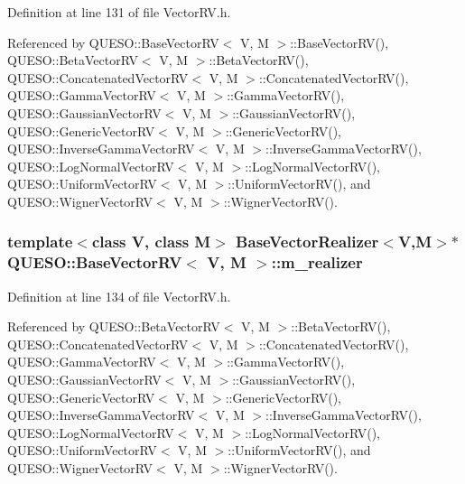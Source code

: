 Definition at line 131 of file Vector\-R\-V.\-h.



Referenced by Q\-U\-E\-S\-O\-::\-Base\-Vector\-R\-V$<$ V, M $>$\-::\-Base\-Vector\-R\-V(), Q\-U\-E\-S\-O\-::\-Beta\-Vector\-R\-V$<$ V, M $>$\-::\-Beta\-Vector\-R\-V(), Q\-U\-E\-S\-O\-::\-Concatenated\-Vector\-R\-V$<$ V, M $>$\-::\-Concatenated\-Vector\-R\-V(), Q\-U\-E\-S\-O\-::\-Gamma\-Vector\-R\-V$<$ V, M $>$\-::\-Gamma\-Vector\-R\-V(), Q\-U\-E\-S\-O\-::\-Gaussian\-Vector\-R\-V$<$ V, M $>$\-::\-Gaussian\-Vector\-R\-V(), Q\-U\-E\-S\-O\-::\-Generic\-Vector\-R\-V$<$ V, M $>$\-::\-Generic\-Vector\-R\-V(), Q\-U\-E\-S\-O\-::\-Inverse\-Gamma\-Vector\-R\-V$<$ V, M $>$\-::\-Inverse\-Gamma\-Vector\-R\-V(), Q\-U\-E\-S\-O\-::\-Log\-Normal\-Vector\-R\-V$<$ V, M $>$\-::\-Log\-Normal\-Vector\-R\-V(), Q\-U\-E\-S\-O\-::\-Uniform\-Vector\-R\-V$<$ V, M $>$\-::\-Uniform\-Vector\-R\-V(), and Q\-U\-E\-S\-O\-::\-Wigner\-Vector\-R\-V$<$ V, M $>$\-::\-Wigner\-Vector\-R\-V().

\hypertarget{class_q_u_e_s_o_1_1_base_vector_r_v_ad99bc05293c0fd0a0accb3191fb7119e}{
\subsubsection[{m\-\_\-realizer}]{\setlength{\rightskip}{0pt plus 5cm}template$<$class V, class M$>$ {\bf Base\-Vector\-Realizer}$<$V,M$>$$\ast$ {\bf Q\-U\-E\-S\-O\-::\-Base\-Vector\-R\-V}$<$ V, M $>$\-::m\-\_\-realizer\hspace{0.3cm}{\ttfamily [protected]}}}\label{class_q_u_e_s_o_1_1_base_vector_r_v_ad99bc05293c0fd0a0accb3191fb7119e}


Definition at line 134 of file Vector\-R\-V.\-h.



Referenced by Q\-U\-E\-S\-O\-::\-Beta\-Vector\-R\-V$<$ V, M $>$\-::\-Beta\-Vector\-R\-V(), Q\-U\-E\-S\-O\-::\-Concatenated\-Vector\-R\-V$<$ V, M $>$\-::\-Concatenated\-Vector\-R\-V(), Q\-U\-E\-S\-O\-::\-Gamma\-Vector\-R\-V$<$ V, M $>$\-::\-Gamma\-Vector\-R\-V(), Q\-U\-E\-S\-O\-::\-Gaussian\-Vector\-R\-V$<$ V, M $>$\-::\-Gaussian\-Vector\-R\-V(), Q\-U\-E\-S\-O\-::\-Generic\-Vector\-R\-V$<$ V, M $>$\-::\-Generic\-Vector\-R\-V(), Q\-U\-E\-S\-O\-::\-Inverse\-Gamma\-Vector\-R\-V$<$ V, M $>$\-::\-Inverse\-Gamma\-Vector\-R\-V(), Q\-U\-E\-S\-O\-::\-Log\-Normal\-Vector\-R\-V$<$ V, M $>$\-::\-Log\-Normal\-Vector\-R\-V(), Q\-U\-E\-S\-O\-::\-Uniform\-Vector\-R\-V$<$ V, M $>$\-::\-Uniform\-Vector\-R\-V(), and Q\-U\-E\-S\-O\-::\-Wigner\-Vector\-R\-V$<$ V, M $>$\-::\-Wigner\-Vector\-R\-V().


